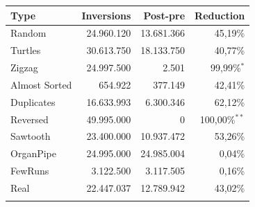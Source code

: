 \small
\begin{tabular*}{\columnwidth}{@{\extracolsep\fill}lrrr@{\extracolsep\fill}}
\toprule
Type & Inversions & Post-pre & Reduction\\
\midrule
Random & 24.960.120 & 13.681.366 & 45,19\% \\
Turtles & 30.613.750 & 18.133.750 & 40,77\% \\
Zigzag & 24.997.500 & 2.501 & 99,99\%$^{*}$ \\
Almost Sorted & 654.922 & 377.149 & 42,41\% \\
Duplicates & 16.633.993 & 6.300.346 & 62,12\% \\
Reversed & 49.995.000 & 0 & 100,00\%$^{**}$ \\
Sawtooth & 23.400.000 & 10.937.472 & 53,26\% \\
OrganPipe & 24.995.000 & 24.985.004 & 0,04\% \\
FewRuns & 3.122.500 & 3.117.505 & 0,16\% \\
Real & 22.447.037 & 12.789.942 & 43,02\% \\
\botrule
\end{tabular*}
